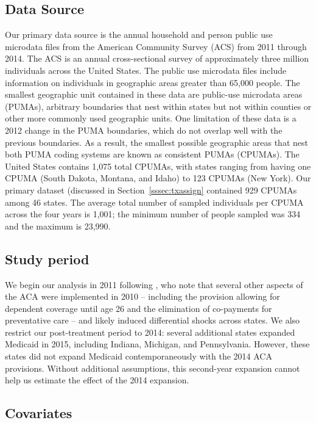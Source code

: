 \documentclass[aoas]{imsart}
\theoremstyle{plain}
\theoremstyle{remark}
\begin{document}
\subsection{Data Source}

Our primary data source is the annual household and person public use microdata files from the American Community Survey (ACS) from 2011 through 2014. The ACS is an annual cross-sectional survey of approximately three million individuals across the United States. The public use microdata files include information on individuals in geographic areas greater than 65,000 people. The smallest geographic unit contained in these data are public-use microdata areas (PUMAs), arbitrary boundaries that nest within states but not within counties or other more commonly used geographic units. One limitation of these data is a 2012 change in the PUMA boundaries, which do not overlap well with the previous boundaries. As a result, the smallest possible geographic areas that nest both PUMA coding systems are known as consistent PUMAs (CPUMAs). The United States contains 1,075 total CPUMAs, with states ranging from having one CPUMA (South Dakota, Montana, and Idaho) to 123 CPUMAs (New York). Our primary dataset (discussed in Section~\ref{sssec:txassign} contained 929 CPUMAs among 46 states. The average total number of sampled individuals per CPUMA across the four years is 1,001; the minimum number of people sampled was 334 and the maximum is 23,990.

\subsection{Study period}

We begin our analysis in 2011 following \cite{courtemanche2017early}, who note that several other aspects of the ACA were implemented in 2010 -- including the provision allowing for dependent coverage until age 26 and the elimination of co-payments for preventative care -- and likely induced differential shocks across states. We also restrict our post-treatment period to 2014: several additional states expanded Medicaid in 2015, including Indiana, Michigan, and Pennsylvania. However, these states did not expand Medicaid contemporaneously with the 2014 ACA provisions. Without additional assumptions, this second-year expansion cannot help us estimate the effect of the 2014 expansion. 

\subsection{Covariates}
\end{document}

